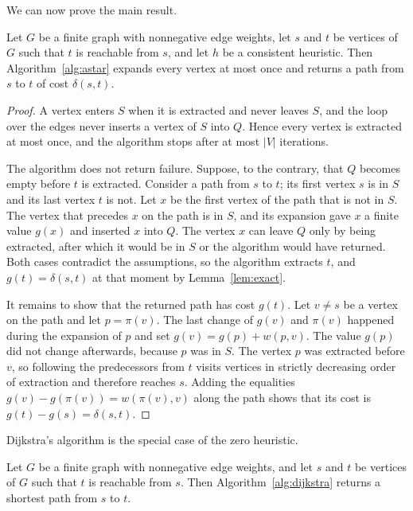 We can now prove the main result.

\begin{theorem}\label{thm:consistent}
Let $G$ be a finite graph with nonnegative edge weights, let $s$ and $t$ be
vertices of $G$ such that $t$ is reachable from $s$, and let $h$ be a
consistent heuristic. Then Algorithm~\ref{alg:astar} expands every vertex at
most once and returns a path from $s$ to $t$ of cost $\delta(s,t)$.
\end{theorem}

\begin{proof}
A vertex enters $S$ when it is extracted and never leaves $S$, and the loop over
the edges never inserts a vertex of $S$ into $Q$. Hence every vertex is extracted
at most once, and the algorithm stops after at most $|V|$ iterations.

The algorithm does not return failure. Suppose, to the contrary, that $Q$
becomes empty before $t$ is extracted. Consider a path from $s$ to $t$; its
first vertex $s$ is in $S$ and its last vertex $t$ is not. Let $x$ be the first
vertex of the path that is not in $S$. The vertex that precedes $x$ on the path
is in $S$, and its expansion gave $x$ a finite value $g(x)$ and inserted $x$
into $Q$. The vertex $x$ can leave $Q$ only by being extracted, after which it
would be in $S$ or the algorithm would have returned. Both cases contradict the
assumptions, so the algorithm extracts $t$, and $g(t) = \delta(s,t)$ at that
moment by Lemma~\ref{lem:exact}.

It remains to show that the returned path has cost $g(t)$. Let $v \neq s$ be a
vertex on the path and let $p = \pi(v)$. The last change of $g(v)$ and $\pi(v)$
happened during the expansion of $p$ and set $g(v) = g(p) + w(p,v)$. The value
$g(p)$ did not change afterwards, because $p$ was in $S$. The vertex $p$ was
extracted before $v$, so following the predecessors from $t$ visits vertices in
strictly decreasing order of extraction and therefore reaches $s$. Adding the
equalities $g(v) - g(\pi(v)) = w(\pi(v), v)$ along the path shows that its cost
is $g(t) - g(s) = \delta(s,t)$.
\end{proof}

Dijkstra's algorithm is the special case of the zero heuristic.

\begin{corollary}\label{cor:dijkstra}
Let $G$ be a finite graph with nonnegative edge weights, and let $s$ and $t$ be
vertices of $G$ such that $t$ is reachable from $s$. Then
Algorithm~\ref{alg:dijkstra} returns a shortest path from $s$ to $t$.
\end{corollary}

